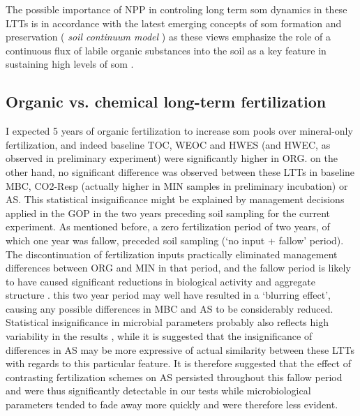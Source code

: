 	The possible importance of NPP in controling long term \gls{som} dynamics in these LTTs is in accordance with the latest emerging concepts of \gls{som} formation and preservation (\textit{ soil continuum model} ) as these views emphasize the role of a continuous flux of labile organic substances into the soil as a key feature in sustaining high levels of \gls{som} \cite{kleber2010, lehmann2015}.

	\subsection{Organic vs. chemical long-term fertilization}
	I expected 5 years of organic fertilization to increase \gls{som} pools over mineral-only fertilization, and indeed baseline TOC, WEOC and HWES (and HWEC, as observed in preliminary experiment) were significantly higher in ORG. on the other hand, no significant difference was observed between these LTTs in baseline MBC, CO2-Resp (actually higher in MIN samples in preliminary incubation) or AS. This statistical insignificance might be explained by management decisions applied in the GOP in the two years preceding soil sampling for the current experiment. As mentioned before, a zero fertilization period of two years, of which one year was fallow, preceded soil sampling (‘no input + fallow' period). The discontinuation of fertilization inputs practically eliminated management differences between ORG and MIN in that period, and the fallow period is likely to have caused significant reductions in biological activity and aggregate structure \citep{redmile-gordon2020, golchin1994, }. this two year period may well have resulted in a ‘blurring effect’, causing any possible differences in MBC and AS to be considerably reduced.
	Statistical insignificance in microbial parameters probably also reflects high variability in the results , while it is suggested that the insignificance of differences in AS may be more expressive of actual similarity between these LTTs with regards to this particular feature.
	It is therefore suggested that the effect of contrasting fertilization schemes on AS persisted throughout this fallow period and were thus significantly detectable  in our tests while microbiological parameters tended to fade away more quickly and were therefore less evident.

